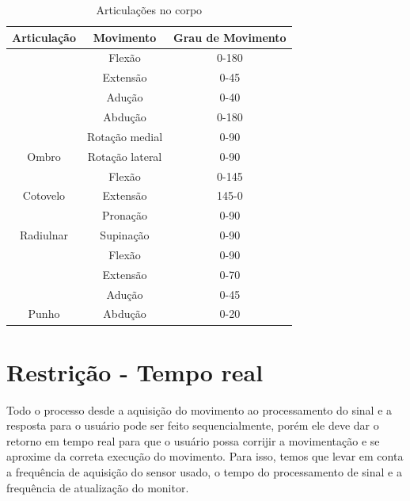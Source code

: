 \begin{table}[]
\centering
\caption{Articulações no corpo}
\label{Juntas no corpo}
\begin{tabular}{|c|c|c|}
\hline
\rowcolor[HTML]{C0C0C0} 
Articulação                 & Movimento       & Grau de  Movimento \\ \hline
                            & Flexão          & 0-180              \\ \cline{2-3} 
                            & Extensão        & 0-45               \\ \cline{2-3} 
                            & Adução          & 0-40               \\ \cline{2-3} 
                            & Abdução         & 0-180              \\ \cline{2-3} 
                            & Rotação medial  & 0-90               \\ \cline{2-3} 
\multirow{-6}{*}{Ombro}     & Rotação lateral & 0-90               \\ \hline
                            & Flexão          & 0-145              \\ \cline{2-3} 
\multirow{-2}{*}{Cotovelo}  & Extensão        & 145-0              \\ \hline
                            & Pronação        & 0-90               \\ \cline{2-3} 
\multirow{-2}{*}{Radiulnar} & Supinação       & 0-90               \\ \hline
                            & Flexão          & 0-90               \\ \cline{2-3} 
                            & Extensão        & 0-70               \\ \cline{2-3} 
                            & Adução          & 0-45               \\ \cline{2-3} 
\multirow{-4}{*}{Punho}     & Abdução         & 0-20               \\ \hline
\end{tabular}
\end{table}

\section{Restrição - Tempo real}
\label{Sec:restrição}
  Todo o processo desde a aquisição do movimento ao processamento do sinal e a 
resposta para o usuário pode ser feito sequencialmente, porém ele deve dar o 
retorno em tempo real para que o usuário possa corrijir a movimentação e se 
aproxime da correta execução do movimento. Para isso, temos que levar em conta 
a frequência de aquisição do sensor usado, o tempo do processamento de sinal e 
a frequência de atualização do monitor.

